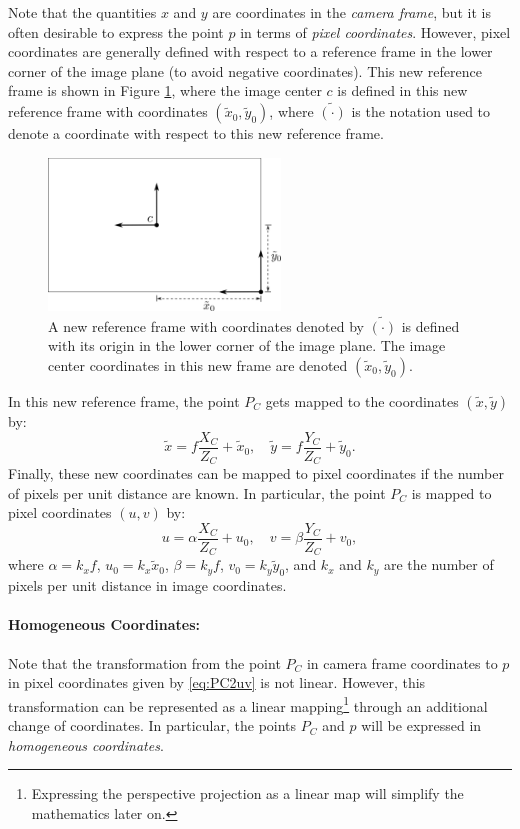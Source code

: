 Note that the quantities $x$ and $y$ are coordinates in the \textit{camera frame}, but it is often desirable to express the point $p$ in terms of \textit{pixel coordinates}. However, pixel coordinates are generally defined with respect to a reference frame in the lower corner of the image plane (to avoid negative coordinates). This new reference frame is shown in Figure \ref{fig:camera_coordinates}, where the image center $c$ is defined in this new reference frame with coordinates $(\tilde{x}_0, \tilde{y}_0)$, where $\tilde{(\cdot)}$ is the notation used to denote a coordinate with respect to this new reference frame.
\begin{figure}[ht]
\includegraphics[width=0.55\textwidth]{tex/figs/ch09_figs/imageframe.png}
\centering
\caption{A new reference frame with coordinates denoted by $\tilde{(\cdot)}$  is defined with its origin in the lower corner of the image plane. The image center coordinates in this new frame are denoted $(\tilde{x}_0, \tilde{y}_0)$.}
\label{fig:camera_coordinates}
\end{figure}
In this new reference frame, the point $P_C$ gets mapped to the coordinates $(\tilde{x}, \tilde{y})$ by:
\begin{equation} \label{eq:PC2xtyt}
    \tilde{x} = f\frac{X_C}{Z_C} + \tilde{x}_0, \quad  \tilde{y} = f\frac{Y_C}{Z_C} + \tilde{y}_0.
\end{equation}
Finally, these new coordinates can be mapped to pixel coordinates if the number of pixels per unit distance are known. In particular, the point $P_C$ is mapped to pixel coordinates $(u,v)$ by:
\begin{equation} \label{eq:PC2uv}
   u = \alpha \frac{X_C}{Z_C} + u_0, \quad  v = \beta \frac{Y_C}{Z_C} + v_0,
\end{equation}
where $\alpha = k_xf$, $u_0 = k_x \tilde{x}_0$, $\beta = k_y f$, $v_0 = k_y \tilde{y}_0$, and $k_x$ and $k_y$ are the number of pixels per unit distance in image coordinates.

\paragraph{Homogeneous Coordinates:}
Note that the transformation from the point $P_C$ in camera frame coordinates to $p$ in pixel coordinates given by \eqref{eq:PC2uv} is not linear. However, this transformation can be represented as a linear mapping\footnote{Expressing the perspective projection as a linear map will simplify the mathematics later on.} through an additional change of coordinates. In particular, the points $P_C$ and $p$ will be expressed in \textit{homogeneous coordinates}.

